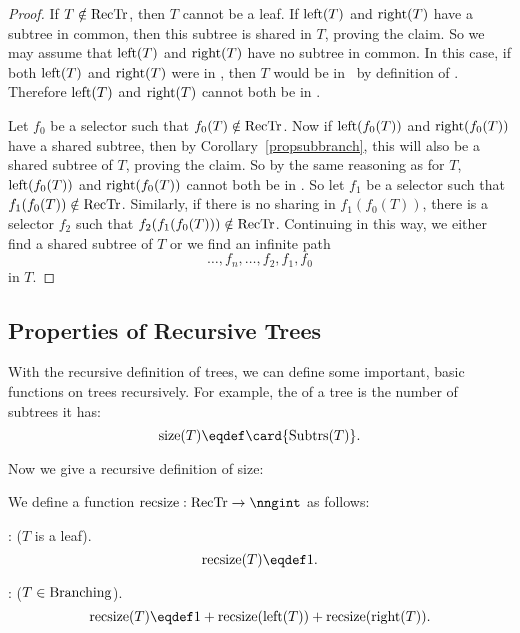 \begin{proof}
If $T \notin \text{RecTr}$, then $T$ cannot be a leaf.  If $\text{left}(T)$
and $\text{right}(T)$ have a subtree in common, then this subtree is
shared in $T$, proving the claim.  So we may assume that
$\text{left}(T)$ and $\text{right}(T)$ have no subtree in common.  In
this case, if both $\text{left}(T)$ and $\text{right}(T)$ were in
\rectr, then $T$ would be in \rectr\ by definition of \rectr.
Therefore $\text{left}(T)$ and $\text{right}(T)$ cannot both be in
\rectr.

Let $f_0$ be a selector such that $f_0(T) \notin \text{RecTr}$.  Now if
$\text{left}(f_0(T))$ and $\text{right}(f_0(T))$ have a shared subtree,
then by Corollary~\ref{propsubbranch}, this will also be a shared
subtree of $T$, proving the claim.  So by the same reasoning as for
$T$, $\text{left}(f_0(T))$ and $\text{right}(f_0(T))$ cannot both be in
\rectr.  So let $f_1$ be a selector such that $f_1(f_0(T)) \notin
\text{RecTr}$.  Similarly, if there is no sharing in $f_1(f_0(T))$, there is
a selector $f_2$ such that $f_2(f_1(f_0(T))) \notin \text{RecTr}$.
Continuing in this way, we either find a shared subtree of $T$ or we
find an infinite path
\[
\dots,f_n,\dots, f_2,f_1,f_0
\]
in $T$.
\end{proof}

\subsection{Properties of Recursive Trees}

With the recursive definition of trees, we can define some important,
basic functions on trees recursively.  For example, the  of
a tree is the number of subtrees it has:
\begin{equation}\label{treesizedef}
\text{size}(T) \eqdef \card{\subbrn{T}}.
\end{equation}

Now we give a recursive definition of size:
\begin{definition}
We define a function $\trsize{}: \rectr \to \nngint$ as follows:

: ($T$ is a leaf).
\[
\trsize{(T)} \eqdef 1.
\]

: ($T \in \text{Branching}$).
\[
\trsize{(T)} \eqdef 1 + \trsize{(\leftsub{(T)})} + \trsize{(\rightsub{(T)})}.
\]
\end{definition}

